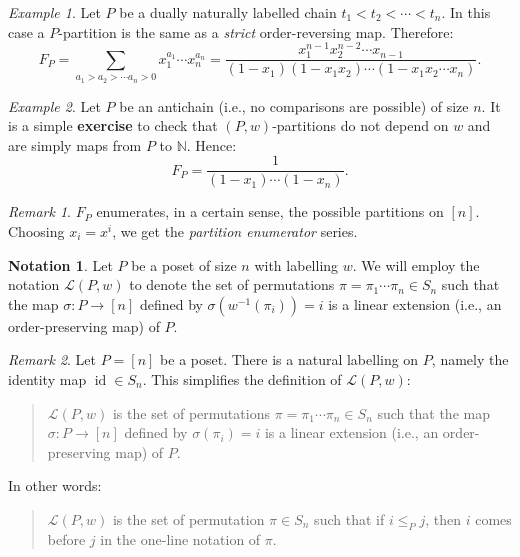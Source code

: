 \documentclass[11pt]{amsart}
\theoremstyle{plain}
\theoremstyle{definition}
\newtheorem*{notation}{Notation}
\theoremstyle{remark}
\newtheorem{remark}{Remark}[section]
\newtheorem{example}{Example}[section]
\newcommand{\LL}{\mathcal{L}}
\newcommand{\NN}{\mathbb{N}}
\DeclareMathOperator{\id}{id}
\numberwithin{equation}{section}
\begin{document}
\begin{example}
	Let $P$ be a dually naturally labelled chain $t_1 < t_2 < \cdots < t_n$. In this case a $P$-partition is the same as a \textit{strict} order-reversing map.
	Therefore:
	\[
		F_P = \sum_{a_1 > a_2 > \cdots a_n > 0} x_1^{a_1} \cdots x_n^{a_n} = \frac{x_1^{n-1} x_2^{n-2} \cdots x_{n-1}}{(1-x_1) (1-x_1 x_2) \cdots (1 - x_1 x_2 \cdots x_n)}.
	\]
\end{example}

\begin{example} \label{ex:antichain_n}
	Let $P$ be an antichain (i.e., no comparisons are possible) of size $n$. It is a simple \textbf{exercise} to check that
	$(P, w)$-partitions do not depend on $w$ and are simply maps from $P$ to $\NN$. Hence:
	\[ F_P = \frac{1}{(1-x_1) \cdots (1-x_n)}. \]

	\begin{remark}
		$F_P$ enumerates, in a certain sense, the possible partitions on $[n]$. Choosing $x_i = x^i$, we get the \textit{partition enumerator} series.
	\end{remark}
\end{example}

\begin{notation}
	Let $P$ be a poset of size $n$ with labelling $w$.
	We will employ the notation $\LL(P, w)$ to denote the set of permutations $\pi = \pi_1 \cdots \pi_n \in S_n$ such that the map $\sigma : P \to [n]$ defined
	by $\sigma(w^{-1}(\pi_i)) = i$ is a linear extension (i.e., an order-preserving map) of $P$.
\end{notation}

\begin{remark}
	Let $P = [n]$ be a poset. There is a natural labelling on $P$, namely the identity map $\id \in S_n$. This simplifies
	the definition of $\LL(P, w)$:

	\vspace{0.1in}

	\begin{quote}
		$\LL(P, w)$ is the set of permutations $\pi = \pi_1 \cdots \pi_n \in S_n$ such that the map $\sigma : P \to [n]$ defined
		by $\sigma(\pi_i) = i$ is a linear extension (i.e., an order-preserving map) of $P$.
	\end{quote}

	\vspace{0.1in}

	In other words:

	\vspace{0.1in}

	\begin{quote}
		$\LL(P, w)$ is the set of permutation $\pi \in S_n$ such that if $i \leq_P j$, then $i$ comes before $j$ in
		the one-line notation of $\pi$.
	\end{quote}
\end{remark}
\end{document}
